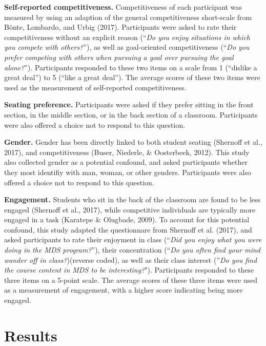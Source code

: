 \documentclass[man]{apa6}
\begin{document}
\textbf{Self-reported competitiveness.} Competitiveness of each participant was measured by using an adaption of the general competitiveness short-scale from Bönte, Lombardo, and Urbig (2017). Participants were asked to rate their competitiveness without an explicit reason (\enquote{\emph{Do you enjoy situations in which you compete with others?}}), as well as goal-oriented competitiveness (\enquote{\emph{Do you prefer competing with others when pursuing a goal over pursuing the goal alone?}}). Participants responded to these two items on a scale from 1 (\enquote{dislike a great deal}) to 5 (\enquote{like a great deal}). The average scores of these two items were used as the measurement of self-reported competitiveness.

\textbf{Seating preference.} Participants were asked if they prefer sitting in the front section, in the middle section, or in the back section of a classroom. Participants were also offered a choice not to respond to this question.

\textbf{Gender.} Gender has been directly linked to both student seating (Shernoff et al., 2017), and competitiveness (Buser, Niederle, \& Oosterbeek, 2012). This study also collected gender as a potential confound, and asked participants whether they most identifiy with man, woman, or other genders. Participants were also offered a choice not to respond to this question.

\textbf{Engagement.} Students who sit in the back of the classroom are found to be less engaged (Shernoff et al., 2017), while competitive individuals are typically more engaged in a task (Karatepe \& Olugbade, 2009). To account for this potential confound, this study adapted the questionnare from Shernoff et al. (2017), and asked participants to rate their enjoyment in class (\enquote{\emph{Did you enjoy what you were doing in the MDS program?}}), their concentration (\enquote{\emph{Do you often find your mind wander off in class?})(reverse coded), as well as their class interest (}\emph{Do you find the course content in MDS to be interesting?}"). Participants responded to these three items on a 5-point scale. The average scores of these three items were used as a measurement of engagement, with a higher score indicating being more engaged.

\hypertarget{results}{%
\section{Results}\label{results}}
\end{document}
